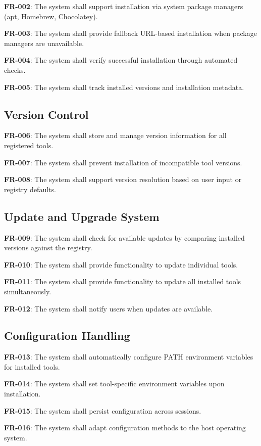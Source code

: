 \documentclass[12pt,a4paper]{report}
\begin{document}
\textbf{FR-002}: The system shall support installation via system package managers (apt, Homebrew, Chocolatey).

\textbf{FR-003}: The system shall provide fallback URL-based installation when package managers are unavailable.

\textbf{FR-004}: The system shall verify successful installation through automated checks.

\textbf{FR-005}: The system shall track installed versions and installation metadata.

\subsection{Version Control}
\textbf{FR-006}: The system shall store and manage version information for all registered tools.

\textbf{FR-007}: The system shall prevent installation of incompatible tool versions.

\textbf{FR-008}: The system shall support version resolution based on user input or registry defaults.

\subsection{Update and Upgrade System}
\textbf{FR-009}: The system shall check for available updates by comparing installed versions against the registry.

\textbf{FR-010}: The system shall provide functionality to update individual tools.

\textbf{FR-011}: The system shall provide functionality to update all installed tools simultaneously.

\textbf{FR-012}: The system shall notify users when updates are available.

\subsection{Configuration Handling}
\textbf{FR-013}: The system shall automatically configure PATH environment variables for installed tools.

\textbf{FR-014}: The system shall set tool-specific environment variables upon installation.

\textbf{FR-015}: The system shall persist configuration across sessions.

\textbf{FR-016}: The system shall adapt configuration methods to the host operating system.
\end{document}
